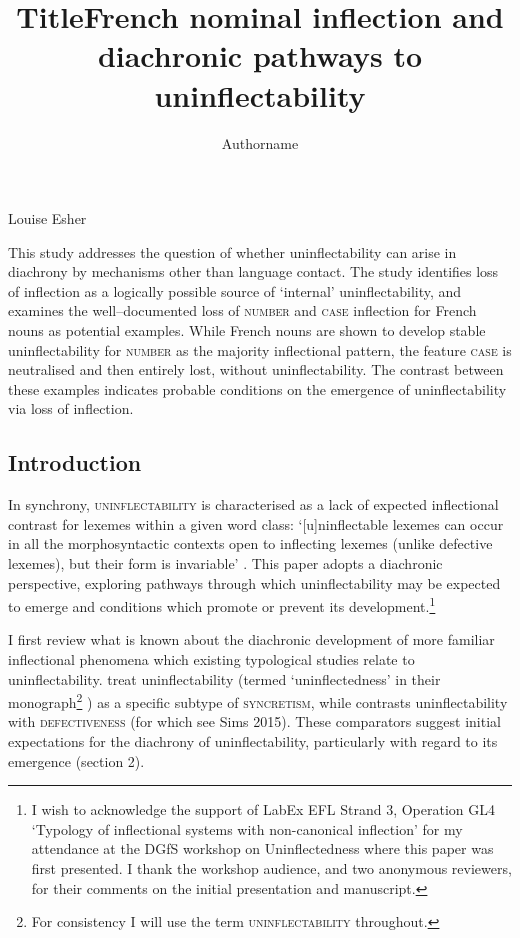 \documentclass[output=paper]{langscibook}
\author{Authorname\orcid{}\affiliation{}}
\title{Title}
\begin{document}
\maketitle 

\title{French nominal inflection and diachronic pathways to uninflectability}

Louise Esher

\begin{stylelsAbstract}
This study addresses the question of whether uninflectability can arise in diachrony by mechanisms other than language contact. The study identifies loss of inflection as a logically possible source of ‘internal’ uninflectability, and examines the well–documented loss of \textsc{number} and \textsc{case} inflection for French nouns as potential examples. While French nouns are shown to develop stable uninflectability for \textsc{number} as the majority inflectional pattern, the feature \textsc{case} is neutralised and then entirely lost, without uninflectability. The contrast between these examples indicates probable conditions on the emergence of uninflectability via loss of inflection.
\end{stylelsAbstract}

\subsection{Introduction}

In synchrony, \textsc{uninflectability} is characterised as a lack of expected inflectional contrast for lexemes within a given word class: ‘[u]ninflectable lexemes can occur in all the morphosyntactic contexts open to inflecting lexemes (unlike defective lexemes), but their form is invariable’ \citep[143]{Spencer2020}. This paper adopts a diachronic perspective, exploring pathways through which uninflectability may be expected to emerge and conditions which promote or prevent its development.\footnote{I wish to acknowledge the support of LabEx EFL Strand 3, Operation GL4 ‘Typology of inflectional systems with non-canonical inflection’ for my attendance at the DGfS workshop on Uninflectedness where this paper was first presented. I thank the workshop audience, and two anonymous reviewers, for their comments on the initial presentation and manuscript.} 

I first review what is known about the diachronic development of more familiar inflectional phenomena which existing typological studies relate to uninflectability. \citet{BaermanEtAl2005} treat uninflectability (termed ‘uninflectedness’ in their monograph\footnote{For consistency I will use the term \textsc{uninflectability} throughout.} ) as a specific subtype of \textsc{syncretism}, while \citet{Spencer2020} contrasts uninflectability with \textsc{defectiveness} (for which see Sims \textsc{2015)}. These comparators suggest initial expectations for the diachrony of uninflectability, particularly with regard to its emergence (section 2). 
\end{document}
